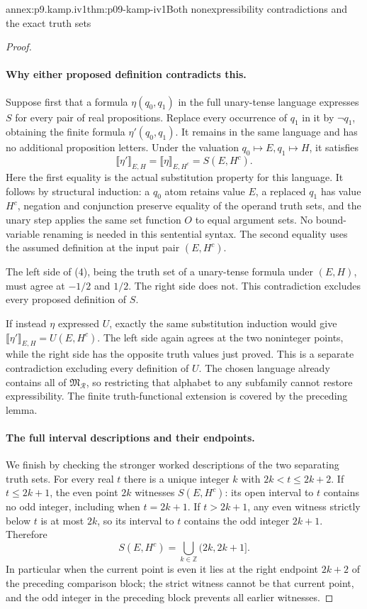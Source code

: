 \begin{annexitem}{annex:p9.kamp.iv1}{thm:p09-kamp-iv1}{Both nonexpressibility contradictions and the exact truth sets}
\begin{proof}
\paragraph{Why either proposed definition contradicts this.}
Suppose first that a formula \(\eta(q_0,q_1)\) in the full
unary-tense language expresses \(S\) for every pair of
real propositions. Replace every occurrence of \(q_1\) in it
by \(\neg q_1\), obtaining the finite formula
\(\eta'(q_0,q_1)\). It remains in the same language and
has no additional proposition letters. Under the valuation
\(q_0\mapsto E,q_1\mapsto H\), it satisfies
\[
 \llbracket\eta'\rrbracket_{E,H}
     =\llbracket\eta\rrbracket_{E,H^c}=S(E,H^c).
 \tag{4}
\]
Here the first equality is the actual substitution property for
this language. It follows by structural induction: a \(q_0\)
atom retains value \(E\), a replaced \(q_1\) has value
\(H^c\), negation and conjunction preserve equality of the
operand truth sets, and the unary step applies the same set
function \(O\) to equal argument sets. No bound-variable
renaming is needed in this sentential syntax. The second equality
uses the assumed definition at the input pair \((E,H^c)\).

The left side of (4), being the truth set of a unary-tense
formula under \((E,H)\), must agree at \(-1/2\) and
\(1/2\). The right side does not. This contradiction excludes
every proposed definition of \(S\).

If instead \(\eta\) expressed \(U\), exactly the same
substitution induction would give
\(\llbracket\eta'\rrbracket_{E,H}=U(E,H^c)\).
The left side again agrees at the two noninteger points, while
the right side has the opposite truth values just proved. This
is a separate contradiction excluding every definition of
\(U\). The chosen language already contains all of
\(\mathfrak M_{\mathcal R}\), so restricting that alphabet
to any subfamily cannot restore expressibility. The finite
truth-functional extension is covered by the preceding lemma.

\paragraph{The full interval descriptions and their endpoints.}
We finish by checking the stronger worked descriptions of the
two separating truth sets. For every real \(t\) there is a
unique integer \(k\) with
\(2k<t\leq2k+2\). If \(t\leq2k+1\), the even
point \(2k\) witnesses \(S(E,H^c)\): its open interval
to \(t\) contains no odd integer, including when
\(t=2k+1\). If \(t>2k+1\), any even witness strictly
below \(t\) is at most \(2k\), so its interval to
\(t\) contains the odd integer \(2k+1\). Therefore
\[
                         S(E,H^c)=
                       \bigcup_{k\in\mathbb Z}(2k,2k+1].
\]
In particular when the current point is even it lies at the
right endpoint \(2k+2\) of the preceding comparison block;
the strict witness cannot be that current point, and the odd
integer in the preceding block prevents all earlier witnesses.


\end{proof}
\end{annexitem}
